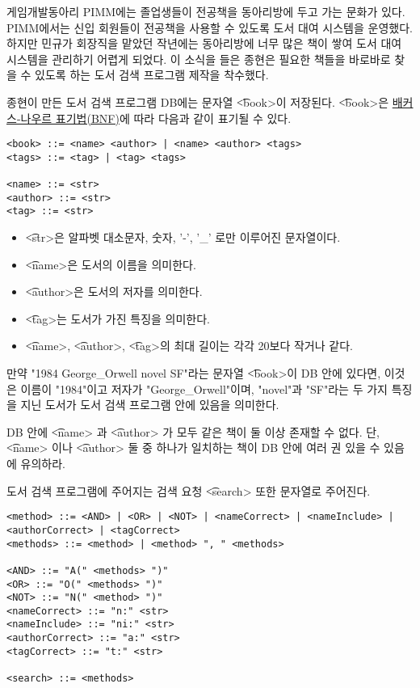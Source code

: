 게임개발동아리 PIMM에는 졸업생들이 전공책을 동아리방에 두고 가는 문화가 있다. PIMM에서는 신입 회원들이 전공책을 사용할 수 있도록 도서 대여 시스템을 운영했다. 하지만 민규가 회장직을 맡았던 작년에는 동아리방에 너무 많은 책이 쌓여 도서 대여 시스템을 관리하기 어렵게 되었다. 이 소식을 들은 종현은 필요한 책들을 바로바로 찾을 수 있도록 하는 도서 검색 프로그램 제작을 착수했다.

종현이 만든 도서 검색 프로그램 DB에는 문자열 \t{<book>}이 저장된다. \t{<book>}은 \href{https://ko.wikipedia.org/wiki/배커스-나우르_표기법}{배커스-나우르 표기법(BNF)}에 따라 다음과 같이 표기될 수 있다.

\begin{lstlisting}
<book> ::= <name> <author> | <name> <author> <tags>
<tags> ::= <tag> | <tag> <tags>

<name> ::= <str>
<author> ::= <str>
<tag> ::= <str>
\end{lstlisting}

\begin{itemize}
  \item \t{<str>}은 알파벳 대소문자, 숫자, '-', '_' 로만 이루어진 문자열이다.
  \item \t{<name>}은 도서의 이름을 의미한다.
  \item \t{<author>}은 도서의 저자를 의미한다. 
  \item \t{<tag>}는 도서가 가진 특징을 의미한다.
  \item \t{<name>}, \t{<author>}, \t{<tag>}의 최대 길이는 각각 20보다 작거나 같다.
\end{itemize}

만약 "1984 George_Orwell novel SF"라는 문자열 \t{<book>}이 DB 안에 있다면, 이것은 
이름이 "1984"이고 저자가 "George_Orwell"이며, "novel"과 "SF"라는 두 가지 특징을 지닌 도서가 도서 검색 프로그램 안에 있음을 의미한다.

DB 안에 \t{<name>} 과 \t{<author>} 가 모두 같은 책이 둘 이상 존재할 수 없다. 단, \t{<name>} 이나 \t{<author>} 둘 중 하나가 일치하는 책이 DB 안에 여러 권 있을 수 있음에 유의하라.


도서 검색 프로그램에 주어지는 검색 요청 \t{<search>} 또한 문자열로 주어진다.

\begin{lstlisting}
<method> ::= <AND> | <OR> | <NOT> | <nameCorrect> | <nameInclude> | <authorCorrect> | <tagCorrect>
<methods> ::= <method> | <method> ", " <methods>

<AND> ::= "A(" <methods> ")"
<OR> ::= "O(" <methods> ")"
<NOT> ::= "N(" <method> ")"
<nameCorrect> ::= "n:" <str>
<nameInclude> ::= "ni:" <str>
<authorCorrect> ::= "a:" <str>
<tagCorrect> ::= "t:" <str>

<search> ::= <methods>
\end{lstlisting}

